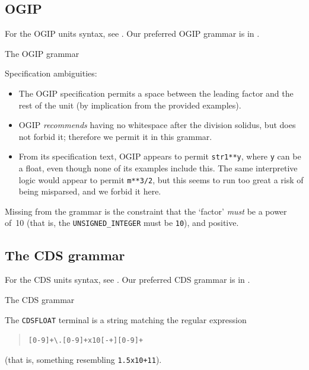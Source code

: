 \documentclass[12pt,notitlepage,onecolumn]{ivoa}
\begin{document}
\subsection{OGIP}
\label{sec:ogipgrammar}

For the OGIP units syntax, see \cite{george95}.  Our preferred OGIP
grammar is in .

\begin{table}

\caption{\label{tabx:ogipgrammar}The OGIP grammar}
\end{table}

Specification ambiguities:
\begin{itemize}
\item The OGIP specification permits a space between the leading
  factor and the rest of the unit (by implication from the provided
  examples).
\item OGIP \emph{recommends} having no whitespace after the division
  solidus, but does not forbid it; therefore we permit it in this
  grammar.
\item From its specification text, OGIP appears to permit
  \texttt{str1**y}, where \texttt{y} can be a float, even though none
  of its examples include this.  The same interpretive logic would
  appear to permit \texttt{m**3/2}, but this seems to run too great a
  risk of being misparsed, and we forbid it here.
\end{itemize}
Missing from the grammar is the constraint that the `factor'
\emph{must} be a power of~10 (that is, the \texttt{UNSIGNED\_INTEGER}
must be \texttt{10}), and positive.

\subsection{The CDS grammar}
\label{sec:cdsgrammar}

For the CDS units syntax, see \cite[\S3.2]{cds00}.  Our preferred CDS
grammar is in .

\begin{table}

\caption{\label{tabx:cdsgrammar}The CDS grammar}
\end{table}

The \texttt{CDSFLOAT} terminal is a string matching the regular
expression
\begin{quotation}
\texttt{[0-9]+\textbackslash.[0-9]+x10[-+][0-9]+}
\end{quotation}
(that is, something resembling \texttt{1.5x10+11}).
\end{document}
